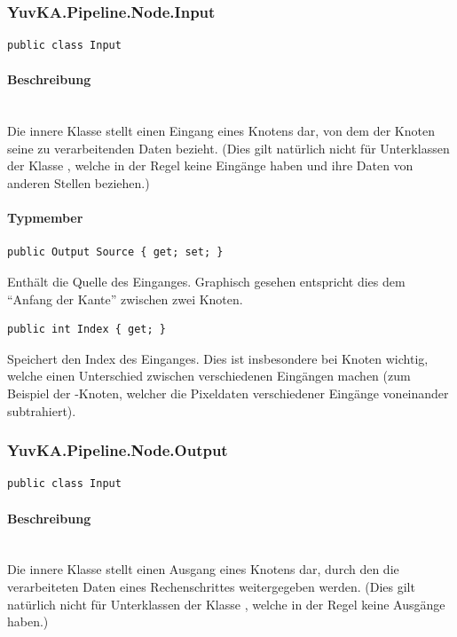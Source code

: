 \subsubsection{YuvKA.Pipeline.Node.Input}

\begin{verbatim}
public class Input
\end{verbatim}

\paragraph{Beschreibung}~\\
Die innere Klasse  stellt einen Eingang eines Knotens dar, von dem der Knoten seine zu verarbeitenden Daten bezieht. (Dies gilt natürlich nicht für Unterklassen der Klasse , welche in der Regel keine Eingänge haben und ihre Daten von anderen Stellen beziehen.)

\paragraph{Typmember}
\begin{itemize}

	\begin{verbatim}
public Output Source { get; set; }
	\end{verbatim}
Enthält die Quelle des Einganges. Graphisch gesehen entspricht dies dem ``Anfang der Kante'' zwischen zwei Knoten.

	\begin{verbatim}
public int Index { get; }
	\end{verbatim}
Speichert den Index des Einganges. Dies ist insbesondere bei Knoten wichtig, welche einen Unterschied zwischen verschiedenen Eingängen machen (zum Beispiel der -Knoten, welcher die Pixeldaten verschiedener Eingänge voneinander subtrahiert).

\end{itemize}


\subsubsection{YuvKA.Pipeline.Node.Output}

\begin{verbatim}
public class Input
\end{verbatim}

\paragraph{Beschreibung}~\\
Die innere Klasse  stellt einen Ausgang eines Knotens dar, durch den die verarbeiteten Daten eines Rechenschrittes weitergegeben werden. (Dies gilt natürlich nicht für Unterklassen der Klasse , welche in der Regel keine Ausgänge haben.)

